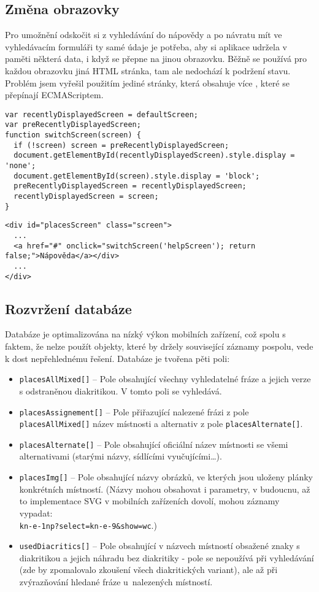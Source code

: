 \subsection{Změna obrazovky}
Pro umožnění odskočit si z vyhledávání do nápovědy a po návratu mít ve vyhledávacím formuláři ty samé údaje je potřeba, aby si aplikace udržela v paměti některá data, i když se přepne na jinou obrazovku. Běžně se používá pro každou obrazovku jiná HTML stránka, tam ale nedochází k podržení stavu.  Problém jsem vyřešil použitím jediné stránky, která obsahuje více , které se přepínají ECMAScriptem.
\begin{verbatim}
var recentlyDisplayedScreen = defaultScreen;
var preRecentlyDisplayedScreen;
function switchScreen(screen) {
  if (!screen) screen = preRecentlyDisplayedScreen;
  document.getElementById(recentlyDisplayedScreen).style.display = 'none';
  document.getElementById(screen).style.display = 'block';
  preRecentlyDisplayedScreen = recentlyDisplayedScreen;
  recentlyDisplayedScreen = screen;
}
\end{verbatim}

\begin{verbatim}
<div id="placesScreen" class="screen">
  ...
  <a href="#" onclick="switchScreen('helpScreen'); return false;">Nápověda</a></div>
  ...
</div>
\end{verbatim}

\subsection{Rozvržení databáze}
Databáze je optimalizována na nízký výkon mobilních zařízení, což spolu s faktem, že nelze použít objekty, které by držely související záznamy pospolu, vede k dost nepřehlednému řešení. Databáze je tvořena pěti poli:
\begin{itemize}
\item \texttt{placesAllMixed[]} -- Pole obsahující všechny vyhledatelné fráze a jejich verze s odstraněnou diakritikou. V tomto poli se vyhledává.
\item \texttt{placesAssignement[]} -- Pole přiřazující nalezené frázi z pole \texttt{placesAllMixed[]} název místnosti a alternativ z pole \texttt{placesAlternate[]}.
\item \texttt{placesAlternate[]} -- Pole obsahující oficiální název místnosti se všemi alternativami (starými názvy, sídlícími vyučujícími\dots).
\item \texttt{placesImg[]} -- Pole obsahující názvy obrázků, ve kterých jsou uloženy plánky konkrétních místností. (Názvy mohou obsahovat i parametry, v budoucnu, až to implementace SVG v mobilních zařízeních dovolí, mohou záznamy vypadat:\\ \texttt{kn-e-1np?select=kn-e-9\&show=wc}.)
\item \texttt{usedDiacritics[]} -- Pole obsahující v názvech místností obsažené znaky s diakritikou a jejich náhradu bez diakritiky - pole se nepoužívá při vyhledávání (zde by zpomalovalo zkoušení všech diakritických variant), ale až při zvýrazňování hledané fráze u~nalezených místností.
\end{itemize}

